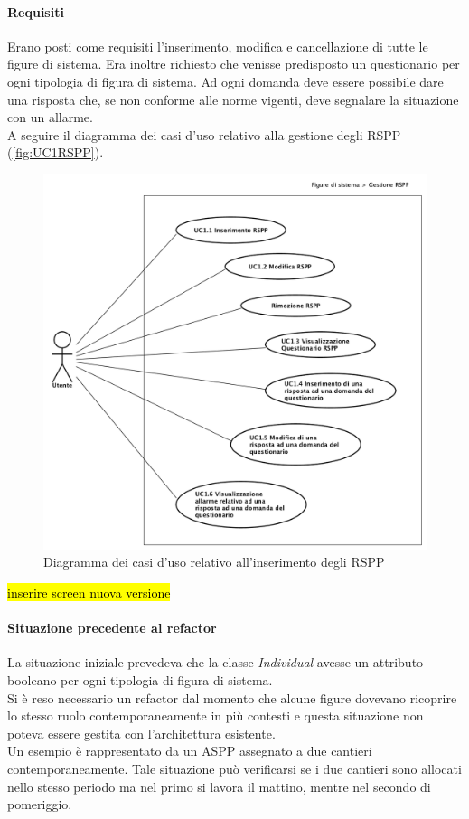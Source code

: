 	\paragraph*{Requisiti}
	Erano posti come requisiti l'inserimento, modifica e cancellazione di tutte le figure di sistema. Era inoltre richiesto che venisse predisposto un questionario per ogni tipologia di figura di sistema. Ad ogni domanda deve essere possibile dare una risposta che, se non conforme alle norme vigenti, deve segnalare la situazione con un allarme.\\
	A seguire il diagramma dei casi d'uso relativo alla gestione degli RSPP (\autoref{fig:UC1RSPP}).
		\begin{figure}[H]
			\begin{center}
				\includegraphics[width=14cm]{Pics/UC1_FigureDiSistema_RSPP.png}
				\caption{Diagramma dei casi d'uso relativo all'inserimento degli RSPP}
				\label{fig:UC1RSPP}
			\end{center}
		\end{figure}
	\hl{inserire screen nuova versione}
	
	\paragraph*{Situazione precedente al refactor}
	La situazione iniziale prevedeva che la classe \textit{Individual} avesse  un attributo booleano per ogni tipologia di figura di sistema. \\
	Si è reso necessario un refactor dal momento che alcune figure dovevano ricoprire lo stesso ruolo contemporaneamente in più contesti e questa situazione non poteva essere gestita con l'architettura esistente. \\
	Un esempio è rappresentato da un ASPP assegnato a due cantieri contemporaneamente. Tale situazione può verificarsi se i due cantieri sono allocati nello stesso periodo ma nel primo si lavora il mattino, mentre nel secondo di pomeriggio.\\
	
